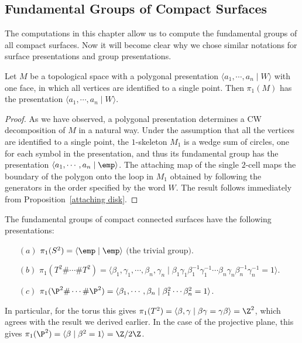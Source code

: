 \subsection{Fundamental Groups of Compact Surfaces}
The computations in this chapter allow us to compute the fundamental groups of all compact surfaces. Now it will become clear why we chose similar notations for surface presentations and group presentations.
\begin{theorem}
Let $M$ be a topological space with a polygonal presentation $\langle a_1,\cdots,a_n\mid W\rangle$ with one face, in which all vertices are identified to a single point. Then $\pi_1(M)$ has the presentation $\langle a_1,\cdots,a_n\mid W\rangle$.
\end{theorem}
\begin{proof}
As we have observed, a polygonal presentation determines a CW decomposition of $M$ in a natural way. Under the assumption that all the vertices are identified to a single point, the $1$-skeleton $M_1$ is a wedge sum of circles, one for each symbol in the presentation, and thus its fundamental group has the presentation $\langle a_1,\cdots,a_n\mid\emp\rangle$. The attaching map of the single $2$-cell maps the boundary of the polygon onto the loop in $M_1$ obtained by following the generators in the order specified by the word $W$. The result follows immediately from Proposition~\ref{attaching disk}.
\end{proof}
\begin{corollary}
The fundamental groups of compact connected surfaces have the following presentations:
\begin{itemize}
\item[$(a)$] $\pi_1(S^2)=\langle\emp\mid\emp\rangle$ $($the trivial group$)$.
\item[$(b)$] $\pi_1(T^2\#\cdots\#T^2)=\langle\beta_1,\gamma_1,\cdots,\beta_n,\gamma_n\mid\beta_1\gamma_1\beta_1^{-1}\gamma_1^{-1}\cdots\beta_n\gamma_n\beta_n^{-1}\gamma_n^{-1}=1\rangle$.
\item[$(c)$] $\pi_1(\P^2\#\cdots\#\P^2)=\langle\beta_1,\cdots,\beta_n\mid\beta_1^2\cdots\beta_n^2=1\rangle$.
\end{itemize}
\end{corollary}
In particular, for the torus this gives $\pi_1(T^2)=\langle\beta,\gamma\mid\beta\gamma=\gamma\beta\rangle=\Z^2$, which agrees with the result we derived earlier. In the case of the projective plane, this gives $\pi_1(\P^2)=\langle\beta\mid\beta^2=1\rangle=\Z/2\Z$.\par
